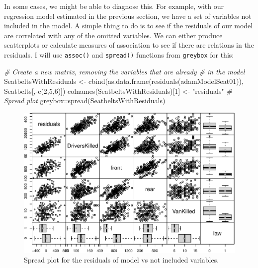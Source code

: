 \documentclass[
]{book}
\newenvironment{Shaded}{\begin{snugshade}}{\end{snugshade}}
\newcommand{\CommentTok}[1]{\textcolor[rgb]{0.56,0.35,0.01}{\textit{#1}}}
\newcommand{\DecValTok}[1]{\textcolor[rgb]{0.00,0.00,0.81}{#1}}
\newcommand{\FunctionTok}[1]{\textcolor[rgb]{0.00,0.00,0.00}{#1}}
\newcommand{\NormalTok}[1]{#1}
\newcommand{\OtherTok}[1]{\textcolor[rgb]{0.56,0.35,0.01}{#1}}
\newcommand{\SpecialCharTok}[1]{\textcolor[rgb]{0.00,0.00,0.00}{#1}}
\newcommand{\StringTok}[1]{\textcolor[rgb]{0.31,0.60,0.02}{#1}}
\theoremstyle{definition}
\theoremstyle{definition}
\theoremstyle{definition}
\theoremstyle{definition}
\theoremstyle{remark}
\begin{document}
In some cases, we might be able to diagnose this. For example, with our regression model estimated in the previous section, we have a set of variables not included in the model. A simple thing to do is to see if the residuals of our model are correlated with any of the omitted variables. We can either produce scatterplots or calculate measures of association \citep[see Section 2.2 and Chapter 6 of][]{SvetunkovSBA} to see if there are relations in the residuals. I will use \texttt{assoc()} and \texttt{spread()} functions from \texttt{greybox} for this:

\begin{Shaded}
\begin{Highlighting}[]
\CommentTok{\# Create a new matrix, removing the variables that are already}
\CommentTok{\# in the model}
\NormalTok{SeatbeltsWithResiduals }\OtherTok{\textless{}{-}}
  \FunctionTok{cbind}\NormalTok{(}\FunctionTok{as.data.frame}\NormalTok{(}\FunctionTok{residuals}\NormalTok{(adamModelSeat01)),}
\NormalTok{        Seatbelts[,}\SpecialCharTok{{-}}\FunctionTok{c}\NormalTok{(}\DecValTok{2}\NormalTok{,}\DecValTok{5}\NormalTok{,}\DecValTok{6}\NormalTok{)])}
\FunctionTok{colnames}\NormalTok{(SeatbeltsWithResiduals)[}\DecValTok{1}\NormalTok{] }\OtherTok{\textless{}{-}} \StringTok{"residuals"}
\CommentTok{\# Spread plot}
\NormalTok{greybox}\SpecialCharTok{::}\FunctionTok{spread}\NormalTok{(SeatbeltsWithResiduals)}
\end{Highlighting}
\end{Shaded}

\begin{figure}
\centering
\includegraphics{Svetunkov--2022----ADAM_files/figure-latex/carSeatsSpread-1.pdf}
\caption{\label{fig:carSeatsSpread}Spread plot for the residuals of model vs not included variables.}
\end{figure}
\end{document}
